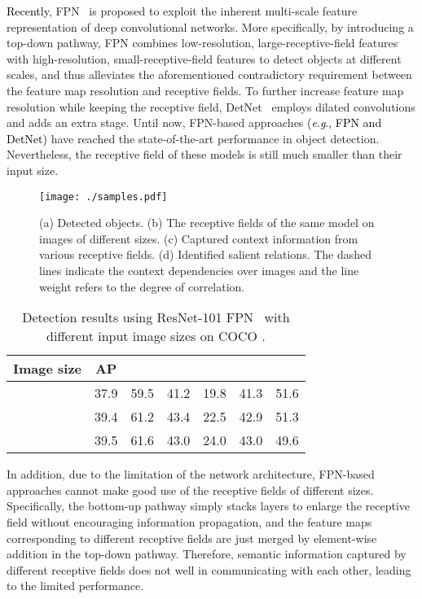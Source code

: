 \documentclass[journal]{IEEEtran}
\newcommand{\eg}{\textit{e}.\textit{g}.\xspace}
\def\qcr{\fontfamily{qcr}\selectfont}
\def\myblue{\textcolor{black}}
\begin{document}
	\myblue{Recently}, FPN~\cite{lin2017feature} is proposed to exploit the inherent multi-scale feature representation of deep convolutional networks. 
More specifically, by introducing a top-down pathway, FPN combines low-resolution, large-receptive-field features with high-resolution, small-receptive-field features to detect objects at different scales, and thus alleviates the aforementioned contradictory requirement between the feature map resolution and receptive fields. To further increase feature map resolution while keeping the receptive field, DetNet~\cite{li2018detnet} employs dilated convolutions and adds an extra stage. Until now, FPN-based approaches \myblue{(\eg, FPN and DetNet)} have reached the state-of-the-art performance in object detection. Nevertheless, the receptive field of these models is still much smaller than their input size.


	
	\begin{figure}[t]
		\begin{center}
\texttt{[image: ./samples.pdf]}
		\end{center}
\caption{
(a) Detected objects.
			(b) The receptive fields of the same model on images of different sizes.
			(c) Captured context information from various receptive fields. 
			(d) Identified salient relations.
The dashed lines indicate the context dependencies over images and the line weight refers to the degree of correlation.
		}
		\label{fig:samples}
	\end{figure}
	
	\begin{table}[t]
		\centering
\caption{Detection results using ResNet-101 FPN~\cite{lin2017feature} with different input image sizes on COCO {\qcr{minival}}.}
			\resizebox{1.0\linewidth}{!}
		{
			\begin{tabular}{c|cccccc}
				\toprule
				Image size & AP &  &  &  &  &  \\
				\hline
				 & 37.9  & 59.5  & 41.2  & 19.8 & 41.3  & 51.6 \\
				 & 39.4  & 61.2  & 43.4  & 22.5 & 42.9  & 51.3 \\
				 & 39.5  & 61.6  & 43.0  & 24.0 & 43.0  & 49.6 \\
				\bottomrule
			\end{tabular}}
\label{tab:impact_image_size}\end{table}



	In addition, due to the limitation of the network architecture, FPN-based approaches cannot make good use of the receptive fields of different sizes. Specifically, the bottom-up pathway simply stacks layers to enlarge the receptive field without encouraging information propagation, and the feature maps corresponding to different receptive fields are just merged by element-wise addition in the top-down pathway. 
	Therefore, semantic information captured by different receptive fields does not well in communicating with each other, leading to the limited performance.
	
\end{document}

